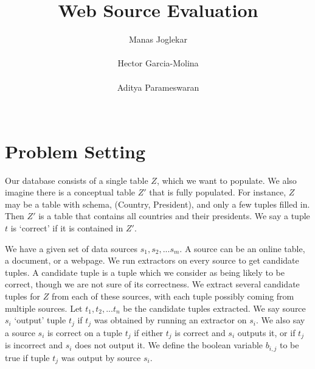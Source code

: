 \documentclass{sig-alternate}
\begin{document}
\title{Web Source Evaluation}
\author{
\alignauthor
Manas Joglekar\\
       \\
\alignauthor
Hector Garcia-Molina\\
       \\
\alignauthor 
Aditya Parameswaran\\
       \\
}
\maketitle

\begin{abstract}
\end{abstract}

\section{Problem Setting}
Our database consists of a single table $Z$, which we want to populate. We also imagine there is a conceptual table $Z'$ that is fully populated. For instance, $Z$ may be a table with schema, (Country, President), and only a few tuples filled in. Then $Z'$ is a table that contains all countries and their presidents. We say a tuple $t$ is `correct' if it is contained in $Z'$. 

We have a given set of data sources $s_1, s_2, ... s_m$. A source can be an online table, a document, or a webpage. We run extractors on every source to get candidate tuples. A candidate tuple is a tuple which we consider as being likely to be correct, though we are not sure of its correctness. We extract several candidate tuples for $Z$ from each of these sources, with each tuple possibly coming from multiple sources. Let $t_1, t_2, ... t_n$ be the candidate tuples extracted. We say source $s_i$ `output' tuple $t_j$ if $t_j$ was obtained by running an extractor on $s_i$. We also say a source $s_i$ is correct on a tuple $t_j$ if either $t_j$ is correct and $s_i$ outputs it, or if $t_j$ is incorrect and $s_i$ does not output it. We define the boolean variable $b_{i,j}$ to be true if tuple $t_j$ was output by source $s_i$. 
\end{document}
